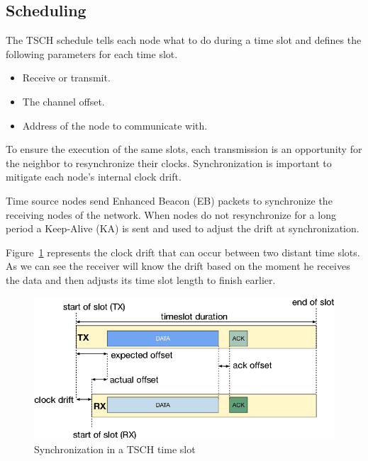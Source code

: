 

\subsection{Scheduling}

The TSCH schedule tells each node what to do during a time slot and defines the
following parameters for each time slot.

\begin{itemize}
  \item Receive or transmit.
  \item The channel offset.
  \item Address of the node to communicate with.
\end{itemize}

To ensure the execution of the same slots, each transmission is an opportunity
for the neighbor to resynchronize their clocks.
Synchronization is important to mitigate each node's internal clock drift.

Time source nodes send Enhanced Beacon (EB) packets to synchronize the receiving
nodes of the network. When nodes do not resynchronize for a long period
a Keep-Alive (KA) is sent and used to adjust the drift at synchronization.

Figure~\ref{fig:sync} represents the clock drift that can occur between two
distant time slots.
As we can see the receiver will know the drift based on the moment he receives
the data and then adjusts its time slot length to finish earlier.

\begin{figure}[H]
  \centering
  \includegraphics[width=\textwidth]{thesis.tex/chapters/context/fig/sync.png}
  \caption{Synchronization in a TSCH time slot\cite{TELESHERMETO201784}\label{fig:sync}}
\end{figure}

